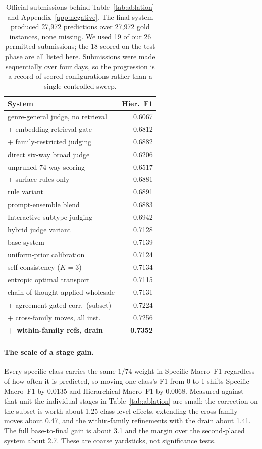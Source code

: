 \documentclass[11pt]{article}
\begin{document}
\begin{table}[!ht]
\centering\footnotesize
\setlength{\tabcolsep}{4pt}
\begin{tabular}{lr}
\toprule
System & Hier.\ F1 \\
\midrule
genre-general judge, no retrieval   & 0.6067 \\
\; + embedding retrieval gate       & 0.6812 \\
\; + family-restricted judging      & 0.6882 \\
direct six-way broad judge          & 0.6206 \\
unpruned 74-way scoring             & 0.6517 \\
\; + surface rules only             & 0.6881 \\
rule variant                        & 0.6891 \\
prompt-ensemble blend               & 0.6883 \\
Interactive-subtype judging         & 0.6942 \\
hybrid judge variant                & 0.7128 \\
\; base system                      & 0.7139 \\
uniform-prior calibration           & 0.7124 \\
self-consistency ($K{=}3$)          & 0.7134 \\
entropic optimal transport          & 0.7115 \\
chain-of-thought applied wholesale  & 0.7131 \\
\; + agreement-gated corr.\ (subset)& 0.7224 \\
\; + cross-family moves, all inst.\ & 0.7256 \\
\textbf{\; + within-family refs, drain} & \textbf{0.7352} \\
\bottomrule
\end{tabular}
\caption{Official submissions behind Table~\ref{tab:ablation} and Appendix~\ref{app:negative}.
The final system produced 27{,}972 predictions over 27{,}972 gold instances, none
missing. We used 19 of our 26 permitted submissions; the 18 scored on the test phase are all
listed here. Submissions were made sequentially over four days, so the progression is a record
of scored configurations rather than a single controlled sweep.}
\label{tab:subs}
\end{table}

\paragraph{The scale of a stage gain.} Every specific class carries the same $1/74$ weight in
Specific Macro~F1 regardless of how often it is predicted, so moving one class's F1 from 0 to 1
shifts Specific Macro~F1 by 0.0135 and Hierarchical Macro~F1 by 0.0068. Measured against that
unit the individual stages in Table~\ref{tab:ablation} are small: the correction on the subset
is worth about 1.25 class-level effects, extending the cross-family moves about 0.47, and the
within-family refinements with the drain about 1.41. The full base-to-final gain is about 3.1
and the margin over the second-placed system about 2.7. These are coarse yardsticks, not
significance tests.
\end{document}
